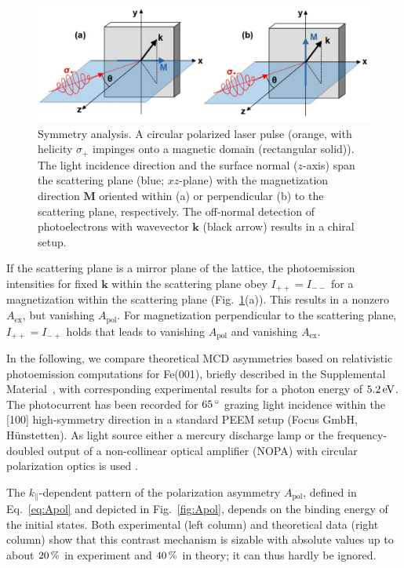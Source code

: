 \documentclass[prl,twocolumn,floatfix,superscriptaddress,aps]{revtex4-2}
\renewcommand{\vec}[1]{\boldsymbol{#1}}
\begin{document}
\begin{figure}
    \centering
    \includegraphics[width = \columnwidth]{symmetry}
    \caption{Symmetry analysis. A circular polarized laser pulse (orange, with helicity $\sigma_{+}$ impinges onto a magnetic domain (rectangular solid)). The light incidence direction and the surface normal ($z$-axis) span the scattering plane (blue; $xz$-plane) with the magnetization direction $\vec{M}$ oriented within (a) or perpendicular (b) to the scattering plane, respectively. The off-normal detection of photoelectrons with wavevector $\vec{k}$ (black arrow) results in a chiral setup.}
    \label{fig:symmetry}
\end{figure}

If the scattering plane is a mirror plane of the lattice, the photoemission intensities for fixed $\vec{k}$ within the scattering plane obey $I_{+ +} = I_{- -}$ for a magnetization within the scattering plane (Fig.~\ref{fig:symmetry}(a)). This results in a nonzero $A_{\mathrm{ex}}$, but vanishing $A_{\mathrm{pol}}$. For magnetization perpendicular to the scattering plane, $I_{+ +} = I_{- +}$ holds that leads to vanishing $A_{\mathrm{pol}}$ and vanishing $A_{\mathrm{ex}}$.
 

In the following, we compare theoretical MCD asymmetries based on relativistic photoemission computations for Fe(001), briefly described in the Supplemental Material~\cite{Supplement}, with corresponding experimental results for a photon energy of $\unit[5.2]{eV}$. The photocurrent has been recorded for $\unit[65]{^{\circ}}$ grazing light incidence within the [100] high-symmetry direction in a standard PEEM setup (Focus GmbH, Hünstetten). As light source either a mercury discharge lamp or the frequency-doubled output of a non-collinear optical amplifier (NOPA) with circular polarization optics is used \cite{duncker2012,gillmeister2020, paleschke2021}. 

The $k_{\parallel}$-dependent pattern of the polarization asymmetry $A_{\mathrm{pol}}$, defined in Eq.~\eqref{eq:Apol} and depicted in Fig.~\ref{fig:Apol}, depends on the binding energy of the initial states. Both experimental (left column) and theoretical data (right column) show that this contrast mechanism is sizable with absolute values up to about $\unit[20]{\%}$ in experiment and $\unit[40]{\%}$ in theory; it can thus hardly be ignored. 
\end{document}
